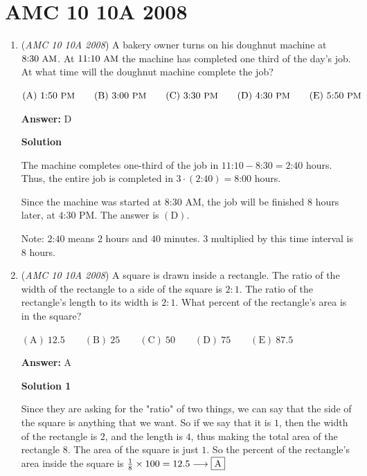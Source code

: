 \section{AMC 10 10A 2008}
        \begin{enumerate}
        	\item (\textit{AMC 10 10A 2008}) A bakery owner turns on his doughnut machine at $\text{8:30}\ {\small\text{AM}}$. At $\text{11:10}\ {\small\text{AM}}$ the machine has completed one third of the day's job. At what time will the doughnut machine complete the job?


 $\mathrm{(A)}\ \text{1:50}\ {\small\text{PM}}\qquad\mathrm{(B)}\ \text{3:00}\ {\small\text{PM}}\qquad\mathrm{(C)}\ \text{3:30}\ {\small\text{PM}}\qquad\mathrm{(D)}\ \text{4:30}\ {\small\text{PM}}\qquad\mathrm{(E)}\ \text{5:50}\ {\small\text{PM}}$

 \textbf{Answer: }D



\textbf{Solution}

The machine completes one-third of the job in $\text{11:10}-\text{8:30}=\text{2:40}$ hours. Thus, the entire job is completed in $3\cdot(\text{2:40})=\text{8:00}$ hours.

 Since the machine was started at $\text{8:30 AM}$, the job will be finished $8$ hours later, at $\text{4:30 PM}$. The answer is $\mathrm{(D)}$.

 Note: $\text{2:40}$ means $2$ hours and $40$ minutes. $3$ multiplied by this time interval is $8$ hours.

 


	\item (\textit{AMC 10 10A 2008}) A square is drawn inside a rectangle. The ratio of the width of the rectangle to a side of the square is $2:1$. The ratio of the rectangle's length to its width is $2:1$. What percent of the rectangle's area is in the square?


 $\mathrm{(A)}\ 12.5\qquad\mathrm{(B)}\ 25\qquad\mathrm{(C)}\ 50\qquad\mathrm{(D)}\ 75\qquad\mathrm{(E)}\ 87.5$

 \textbf{Answer: }A



\textbf{Solution 1}

Since they are asking for the "ratio" of two things, we can say that the side of the square is anything that we want. So if we say that it is $1$, then the width of the rectangle is $2$, and the length is $4$, thus making the total area of the rectangle $8$. The area of the square is just $1$. So the percent of the rectangle's area inside the square is $\frac{1}{8} \times 100 = 12.5 \longrightarrow \fbox{A}$




\end{enumerate}
